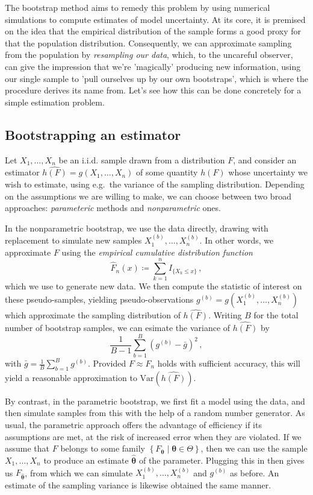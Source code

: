 \documentclass[a4paper]{book}
\begin{document}
The bootstrap method aims to remedy this problem by using numerical simulations to compute estimates of model uncertainty. At its core, it is premised on the idea that the empirical distribution of the sample forms a good proxy for that the population distribution. Consequently, we can approximate sampling from the population by \emph{resampling our data}, which, to the uncareful observer, can give the impression that we're 'magically' producing new information, using our single sample to 'pull ourselves up by our own bootstraps', which is where the procedure derives its name from. Let's see how this can be done concretely for a simple estimation problem.

\subsection{Bootstrapping an estimator}

Let $X_1, \dots, X_n$ be an i.i.d. sample drawn from a distribution $F$, and consider an estimator $\widehat{h(F)} = g(X_1, \dots, X_n)$ of some quantity $h(F)$ whose uncertainty we wish to estimate, using e.g.\ the variance of the sampling distribution. Depending on the assumptions we are willing to make, we can choose between two broad approaches: \emph{parameteric} methods and \emph{nonparametric} ones.

In the nonparametric bootstrap, we use the data directly, drawing with replacement to simulate new samples $X^{(b)}_1, \dots, X^{(b)}_n$. In other words, we approximate $F$ using the \emph{empirical cumulative distribution function}
\begin{equation}
    \widehat{F}_n(x) \coloneqq \sum_{k=1}^n I_{\{ X_k \leq x \}} \,,
\end{equation}
which we use to generate new data. We then compute the statistic of interest on these pseudo-samples, yielding pseudo-observations $g^{(b)} = g(X^{(b)}_1, \dots, X^{(b)}_n)$ which approximate the sampling distribution of $\widehat{h(F)}$. Writing $B$ for the total number of bootstrap samples, we can esimate the variance of $\widehat{h(F)}$ by
\begin{equation}
    \frac{1}{B-1}\sum_{b=1}^B(g^{(b)} - \bar{g})^2 \,,
\end{equation}
with $\bar{g} = \frac{1}{B} \sum_{b=1}^B g^{(b)}$. Provided $F \approx \widehat{F}_n$ holds with sufficient accuracy, this will yield a reasonable approximation to $\mathrm{Var}(\widehat{h(F)})$.

By contrast, in the parametric bootstrap, we first fit a model using the data, and then simulate samples from this with the help of a random number generator. As usual, the parametric approach offers the advantage of efficiency if its assumptions are met, at the risk of increased error when they are violated. If we assume that $F$ belongs to some family $\left \{ F_{\bm{\theta}} \mid  \bm{\theta} \in \Theta \right \}$, then we can use the sample $X_1, \dots, X_n$ to produce an estimate $\bm{\widehat{\theta}}$ of the parameter. Plugging this in then gives us $F_{\bm{\widehat{\theta}}}$, from which we can simulate $X^{(b)}_1, \dots , X^{(b)}_n$ and $g^{(b)}$ as before. An estimate of the sampling variance is likewise obtained the same manner.
\end{document}
